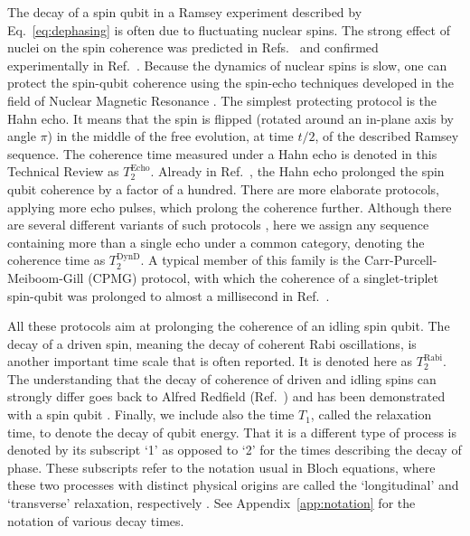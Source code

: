 \documentclass[aps, prx, showpacs, twocolumn, superscriptaddress, notitlepage, longbibliography, floatfix, nofootinbib]{revtex4-2}
\newcommand{\TRabi}{T_2^\mathrm{Rabi}}
\newcommand{\TEcho}{T_2^\mathrm{Echo}}
\newcommand{\TDynD}{T_2^\mathrm{DynD}}
\begin{document}
The decay of a spin qubit in a Ramsey experiment described by Eq.~\eqref{eq:dephasing} is often due to fluctuating nuclear spins. The strong effect of nuclei on the spin coherence was predicted in Refs.~\cite{khaetskii_electron_2002, merkulov_electron_2002} and confirmed experimentally in Ref.~\cite{petta_coherent_2005}. Because the dynamics of nuclear spins is slow, one can protect the spin-qubit coherence using the spin-echo techniques developed in the field of Nuclear Magnetic Resonance \cite{slichter_principles_1996}. The simplest protecting protocol is the Hahn echo\cite{hahn_spin_1950}. It means that the spin is flipped (rotated around an in-plane axis by angle $\pi$) in the middle of the free evolution, at time $t/2$, of the described Ramsey sequence. The coherence time measured under a Hahn echo is denoted in this Technical Review as $ \TEcho$. Already in Ref.~\cite{petta_coherent_2005}, the Hahn echo prolonged the spin qubit coherence by a factor of a hundred. There are more elaborate protocols, applying more echo pulses, which prolong the coherence further. Although there are several different variants of such protocols \cite{alvarez_performance_2010}, here we assign any sequence containing more than a single echo under a common category, denoting the coherence time as $ \TDynD$. A typical member of this family is the Carr-Purcell-Meiboom-Gill (CPMG) protocol, with which the coherence of a singlet-triplet spin-qubit was prolonged to almost a millisecond in Ref.~\cite{malinowski_notch_2016}. 

All these protocols aim at prolonging the coherence of an idling spin qubit. The decay of a driven spin, meaning the decay of coherent Rabi oscillations, is another important time scale that is often reported. It is denoted here as $ \TRabi$. The understanding that the decay of coherence of driven and idling spins can strongly differ goes back to Alfred Redfield (Ref.~\cite{redfield_nuclear_1955}) and has been demonstrated with a spin qubit \cite{laucht_dressed_2016}. Finally, we include also the time $T_1$, called the relaxation time, to denote the decay of qubit energy. That it is a different type of process is denoted by its subscript `1' as opposed to `2' for the times describing the decay of phase. These subscripts refer to the notation usual in Bloch equations, where these two processes with distinct physical origins are called the `longitudinal' and `transverse' relaxation, respectively \cite{bloch_nuclear_1946}. See Appendix~\ref{app:notation} for the notation of various decay times. 
\end{document}
